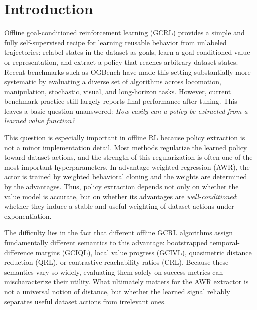 \section{Introduction}

Offline goal-conditioned reinforcement learning (GCRL) provides a simple and fully self-supervised recipe for learning reusable behavior from unlabeled
trajectories: relabel states in the dataset as goals, learn a goal-conditioned value or representation, and extract a policy that reaches arbitrary dataset
states. Recent benchmarks such as OGBench have made this setting substantially more systematic by evaluating a diverse set of algorithms across locomotion,
manipulation, stochastic, visual, and long-horizon tasks. However, current benchmark practice still largely reports final performance after tuning. This
leaves a basic question unanswered: \emph{How easily can a policy be extracted from a learned value function?}

This question is especially important in offline RL because policy extraction is not a minor implementation detail.
Most methods regularize the learned policy toward dataset actions, and the strength of this regularization is often one of the most important hyperparameters.
In advantage-weighted regression (AWR), the actor is trained by weighted behavioral cloning and the weights are determined by the advantages.
Thus, policy extraction depends not only on whether the value model
is accurate, but on whether its advantages are \emph{well-conditioned}: whether they induce a stable and useful weighting of dataset actions under exponentiation.

The difficulty lies in the fact that different offline GCRL algorithms assign fundamentally different semantics to this advantage: bootstrapped temporal-difference margins (GCIQL), local value progress (GCIVL), quasimetric distance reduction (QRL), or contrastive reachability ratios (CRL).
Because these semantics vary so widely, evaluating them solely on success metrics can mischaracterize their utility.
What ultimately matters for the AWR extractor is not a universal notion of distance, but whether the learned signal reliably separates useful dataset actions from irrelevant ones.

